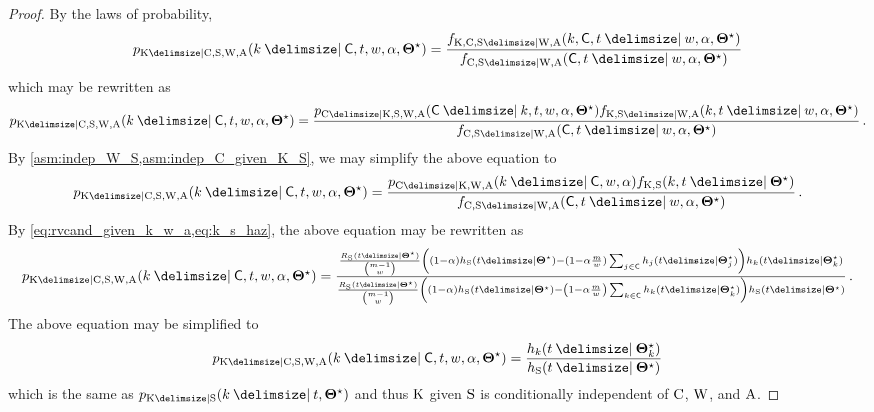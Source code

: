 \documentclass[
    11pt,
    extrafontsizes,
    article,
    oldfontcommands,
    final,
    oneside,
    openany,
    hidelinks]{memoir}
\begin{document}
\begin{proof}
	By the laws of probability,
	\begin{equation}
	\pmf_{\RV{K} \Given \rvcand, \sv, \RV{W}, \RV{A}}(k \Given \cand, t, w, \alpha, \tparam\sysparam) =
	\frac{\pdf_{\RV{K}, \rvcand, \sv \Given \RV{W}, \RV{A}}(k, \cand, t \Given w, \alpha, \tparam\sysparam)}
	{\pdf_{\rvcand,\sv \Given \RV{W},\RV{A}}(\cand,t \Given w, \alpha, \tparam\sysparam)}
	\end{equation}
	which may be rewritten as
	\begin{equation}
	\pmf_{\RV{K} \Given \rvcand, \sv, \RV{W}, \RV{A}}(k \Given \cand, t, w, \alpha, \tparam\sysparam) =
	\frac{\pmf_{\rvcand \Given \RV{K}, \sv, \RV{W}, \RV{A}}(\cand \Given k, t, w, \alpha, \tparam\sysparam) \pdf_{\RV{K},\sv \Given \RV{W},\RV{A}}(k,t \Given w,\alpha, \tparam\sysparam)}
	{\pdf_{\rvcand,\sv \Given \RV{W},\RV{A}}(\cand,t \Given w, \alpha, \tparam\sysparam)}\,.
	\end{equation}
	By \cref{asm:indep_W_S,asm:indep_C_given_K_S}, we may simplify the above equation to
	\begin{equation}
	\pmf_{\RV{K} \Given \rvcand, \sv, \RV{W}, \RV{A}}(k \Given \cand, t, w, \alpha, \tparam\sysparam) =
	\frac{\pmf_{\rvcand \Given \RV{K}, \RV{W}, \RV{A}}(k \Given \cand, w, \alpha) \pdf_{\RV{K},\sv}(k,t \Given \tparam\sysparam)}
	{\pdf_{\rvcand,\sv \Given \RV{W},\RV{A}}(\cand,t \Given w, \alpha, \tparam\sysparam)}\,.
	\end{equation}	
	By \cref{eq:rvcand_given_k_w_a,eq:k_s_haz}, the above equation may be rewritten as
	\begin{equation}
	\mathsmaller{
		\pmf_{\RV{K} \Given \rvcand, \sv, \RV{W}, \RV{A}}(k \Given \cand, t, w, \alpha, \tparam\sysparam) =
		\frac{
			\frac{\srv_{\sv}(t \Given \tparam\sysparam)}{\binom{m-1}{w}}	
			\left((1-\alpha) \haz_{\sv}(t \Given \tparam\sysparam) - (1-\alpha\frac{m}{w}) \sum_{j \in \cand} \haz_j(t \Given \tparam\sysparam_j)\right)
			\haz_k(t \Given \tparam{\sysparam}_k)
		}
		{
			\frac{
				\srv_{\sv}(t \Given \tparam\sysparam)}{\binom{m-1}{w}}
			\left(
			(1-\alpha) \haz_{\sv}(t \Given \tparam\sysparam) - \left(1-\alpha \frac{m}{w}\right) \sum_{k \in \cand} \haz_k(t \Given \tparam\sysparam_k)
			\right) \haz_{\sv}(t \Given \tparam\sysparam)
	}}\,.
	\end{equation}
	The above equation may be simplified to
	\begin{equation}
	\pmf_{\RV{K} \Given \rvcand, \sv, \RV{W}, \RV{A}}(k \Given \cand, t, w, \alpha, \tparam\sysparam) =
	\frac
	{
		\haz_k(t \Given \tparam{\sysparam}_k)
	}
	{
		\haz_{\sv}(t \Given \tparam\sysparam)
	}
	\end{equation}
	which is the same as $\pmf_{\RV{K} \Given \sv}(k \Given t, \tparam\sysparam)$ and thus $\mathrm{K}$ given $\mathrm{S}$ is conditionally independent of $\mathrm{C}$, $\mathrm{W}$, and $\mathrm{A}$.
\end{proof}
\end{document}
